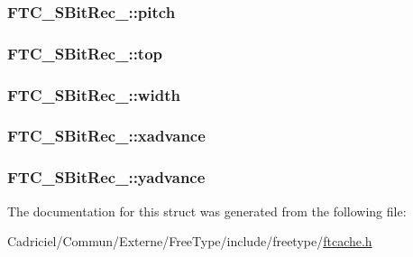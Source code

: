 \hypertarget{struct_f_t_c___s_bit_rec___a1382ec014df599e706c2c1785bc18235}{
\subsubsection[{pitch}]{ F\-T\-C\-\_\-\-S\-Bit\-Rec\-\_\-\-::pitch}}\label{struct_f_t_c___s_bit_rec___a1382ec014df599e706c2c1785bc18235}
\hypertarget{struct_f_t_c___s_bit_rec___a3e558b3a04b70f00f80b862cdc94d9a2}{
\subsubsection[{top}]{ F\-T\-C\-\_\-\-S\-Bit\-Rec\-\_\-\-::top}}\label{struct_f_t_c___s_bit_rec___a3e558b3a04b70f00f80b862cdc94d9a2}
\hypertarget{struct_f_t_c___s_bit_rec___a5b92fb4f213a880f758bb87ac2ceb263}{
\subsubsection[{width}]{ F\-T\-C\-\_\-\-S\-Bit\-Rec\-\_\-\-::width}}\label{struct_f_t_c___s_bit_rec___a5b92fb4f213a880f758bb87ac2ceb263}
\hypertarget{struct_f_t_c___s_bit_rec___a502a0bb69d973d2ae626a842eb9fefd3}{
\subsubsection[{xadvance}]{ F\-T\-C\-\_\-\-S\-Bit\-Rec\-\_\-\-::xadvance}}\label{struct_f_t_c___s_bit_rec___a502a0bb69d973d2ae626a842eb9fefd3}
\hypertarget{struct_f_t_c___s_bit_rec___aabe767ddaf7ff62918886c6f62e9ac28}{
\subsubsection[{yadvance}]{ F\-T\-C\-\_\-\-S\-Bit\-Rec\-\_\-\-::yadvance}}\label{struct_f_t_c___s_bit_rec___aabe767ddaf7ff62918886c6f62e9ac28}


The documentation for this struct was generated from the following file\-:\begin{DoxyCompactItemize}
\item 
Cadriciel/\-Commun/\-Externe/\-Free\-Type/include/freetype/\hyperlink{ftcache_8h}{ftcache.\-h}\end{DoxyCompactItemize}
